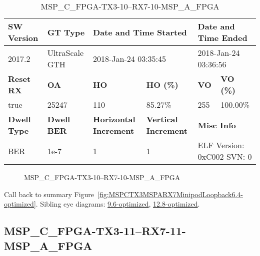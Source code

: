 \begin{table}[h]
\centering
\caption{MSP\_C\_FPGA-TX3-10--RX7-10-MSP\_A\_FPGA}
\label{tab:MSPCFPGATX310RX710MSPAFPGA6.4-optimized}
\begin{tabular}{@{}|l|l|l|l|l|l|@{}}
\toprule
\textbf{SW Version}                & \textbf{GT Type}   & \multicolumn{2}{l|}{\textbf{Date and Time Started}}            & \multicolumn{2}{l|}{\textbf{Date and Time Ended}}        \\ \midrule
2017.2                       & UltraScale GTH          & \multicolumn{2}{l|}{2018-Jan-24 03:35:45}                   & \multicolumn{2}{l|}{2018-Jan-24 03:36:56}               \\ \midrule
\textbf{Reset RX}                  & \textbf{OA} & \textbf{HO}   & \textbf{HO (\%)} & \textbf{VO} & \textbf{VO (\%)} \\ \midrule
true & 25247        & 110          & 85.27\%        & 255        & 100.00\%       \\ \midrule
\textbf{Dwell Type}                & \textbf{Dwell BER} & \textbf{Horizontal Increment} & \textbf{Vertical Increment}    & \multicolumn{2}{l|}{\textbf{Misc Info}}                  \\ \midrule
BER                            & 1e-7        & 1        & 1           & \multicolumn{2}{l|}{ELF Version: 0xC002 SVN: 0}                         \\ \bottomrule
\end{tabular}
\end{table}

\begin{figure}[h]
\caption{MSP\_C\_FPGA-TX3-10--RX7-10-MSP\_A\_FPGA} \label{fig:MSPCFPGATX310RX710MSPAFPGA6.4-optimized}
\end{figure}

Call back to summary Figure~\ref{fig:MSPCTX3MSPARX7MinipodLoopback6.4-optimized}.
Sibling eye diagrams: \hyperref[sec:MSPCFPGATX310RX710MSPAFPGA9.6-optimized]{9.6-optimized}, \hyperref[sec:MSPCFPGATX310RX710MSPAFPGA12.8-optimized]{12.8-optimized}.

\clearpage
\newpage


\subsection{MSP\_C\_FPGA-TX3-11--RX7-11-MSP\_A\_FPGA}\label{sec:MSPCFPGATX311RX711MSPAFPGA6.4-optimized}

